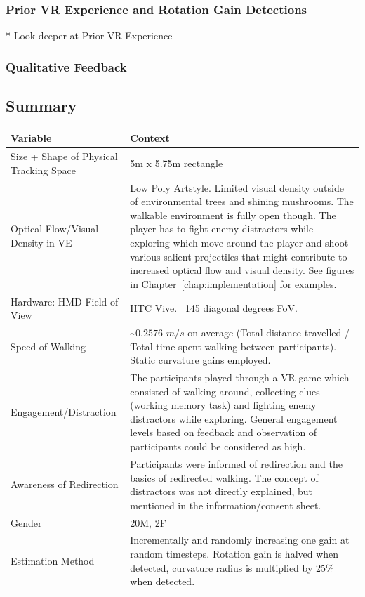 \subsubsection{Prior VR Experience and Rotation Gain Detections}
* Look deeper at Prior VR Experience


\subsubsection{Qualitative Feedback}

\subsection{Summary}
\begin{table}[h!]
\centering
\begin{tabularx}{\textwidth}{|X|X|}
\hline
Variable & Context \\
\hline
Size + Shape of Physical Tracking Space & 5m x 5.75m rectangle \\
\hline
Optical Flow/Visual Density in VE & Low Poly Artstyle. Limited visual density outside of environmental trees and shining mushrooms. The walkable environment is fully open though. The player has to fight enemy distractors while exploring which move around the player and shoot various salient projectiles that might contribute to increased optical flow and visual density. See figures in Chapter~\ref{chap:implementation} for examples.\\
\hline
Hardware: HMD Field of View & HTC Vive. ~145 diagonal degrees FoV. \\
\hline
Speed of Walking & \textasciitilde$0.2576$ $m/s$ on average (Total distance travelled / Total time spent walking between participants). Static curvature gains employed. \\
\hline
Engagement/Distraction & The participants played through a VR game which consisted of walking around, collecting clues (working memory task) and fighting enemy distractors while exploring. General engagement levels based on feedback and observation of participants could be considered as high. \\
\hline
Awareness of Redirection & Participants were informed of redirection and the basics of redirected walking. The concept of distractors was not directly explained, but mentioned in the information/consent sheet. \\
\hline
Gender & 20M, 2F \\
\hline
Estimation Method & Incrementally and randomly increasing one gain at random timesteps. Rotation gain is halved when detected, curvature radius is multiplied by 25\% when detected. \\

\end{tabularx}
\end{table}
